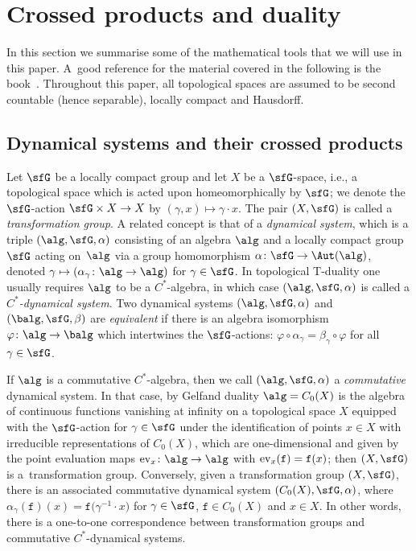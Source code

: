 \section{Crossed products and duality\label{sec:NAdef}}

In this section we summarise some of the mathematical tools that we
will use in this paper. A~good reference for the material covered in
the following is the book~\cite{Williams2007}. Throughout this paper,
all topological spaces are assumed to be second countable (hence
separable), locally compact and Hausdorff.

\subsection{Dynamical systems and their crossed products}

Let $\sfG$ be a locally compact group and let $X$ be a $\sfG$-space, i.e., a
topological space which is acted
upon
homeomorphically by $\sfG$; we denote the $\sfG$-action $\sfG\times
X\to X$ by $(\gamma,x)\mapsto\gamma\cdot x$. The pair $(X,\sfG)$ is
called a \emph{transformation group}.
 A related concept is that of a
\emph{dynamical system}, which is a triple $(\alg,\sfG,\alpha)$
consisting of an algebra $\alg$ and a locally compact group $\sfG$ acting
on~$\alg$ via a group homomorphism $\alpha\colon \sfG\to\Aut (\alg)$,
denoted $\gamma\mapsto(\alpha_\gamma\colon \alg\to\alg)$ for $\gamma\in
\sfG$. In topological
T-duality one usually requires $\alg$ to be a $C^*$-algebra, in which
case $(\alg,\sfG,\alpha)$ is called a \emph{$C^*$-dynamical
 system}. Two dynamical systems $(\alg,\sfG,\alpha)$ and $(\balg,\sfG,\beta)$ are
\emph{equivalent} if there is an algebra isomorphism
$\varphi\colon \alg\to\balg$ which intertwines the $\sfG$-actions: $\varphi\circ\alpha_\gamma =
\beta_\gamma\circ\varphi$ for all $\gamma\in \sfG$.

If $\alg$ is a commutative $C^*$-algebra, then we call $(\alg,\sfG,\alpha)$ a
\emph{commutative} dynamical system. In that case, by Gelfand duality
$\alg=C_0(X)$ is the algebra of continuous functions vanishing at
infinity on a
topological space $X$
equipped with the $\sfG$-action  for $\gamma\in \sfG$ under
the identification of points $x\in X$ with irreducible representations
of $C_0(X)$, which are one-dimensional and given by the point evaluation
maps ${\rm ev}_x\colon \alg\to\alg$ with ${\rm ev}_x(\mathtt{f})=\mathtt{f}(x)$; then
$(X,\sfG)$ is a~transformation group. Conversely, given a transformation
group $(X,\sfG)$, there is an associated commutative dynamical system
$(C_0(X), \sfG,\alpha)$, where $\alpha_\gamma(\mathtt{f})(x)=\mathtt{f}\big(\gamma^{-1}\cdot x\big)$ for $\gamma\in
\sfG$, $\mathtt{f}\in C_0(X)$ and $x\in X$. In other words, there is a one-to-one
correspondence between transformation groups and commutative $C^*$-dynamical
systems.

